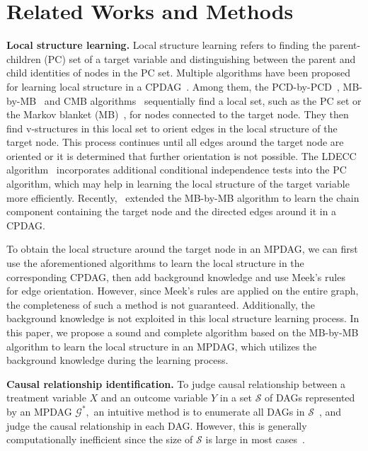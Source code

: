 \documentclass{article}
\begin{document}
\section{Related Works and Methods}
\label{sec:related works}
\textbf{Local structure learning.} Local structure learning refers to finding the parent-children (PC) set of a target variable and distinguishing between the parent and child identities of nodes in the PC set.
Multiple algorithms have been proposed for learning local structure in a CPDAG~\citep{yin2008partial, wang2014discovering, gao2015local, liu2020local, gupta2023local}.
Among them, the PCD-by-PCD~\citep{yin2008partial}, MB-by-MB~\citep{wang2014discovering} and CMB algorithms~\citep{gao2015local} sequentially find a local set, such as the PC set or the Markov blanket (MB)~\citep{tsamardinos2003algorithms, tsamardinos2003time, aliferis2003hiton, pena2007towards}, for nodes connected to the target node. They then find v-structures in this local set to orient edges in the local structure of the target node. This process continues until all edges around the target node are oriented or it is determined that further orientation is not possible. 
The LDECC algorithm~\citep{gupta2023local} incorporates additional conditional independence tests into the PC algorithm, which may help in learning the local structure of the target variable more efficiently.
Recently,~\citet{liu2020local} extended the MB-by-MB algorithm to learn the chain component containing the target node and the directed edges around it in a CPDAG.

To obtain the local structure around the target node in an MPDAG, we can first use the aforementioned algorithms to learn the local structure in the corresponding CPDAG, then add background knowledge and use Meek's rules~\citep{meek1995causal} for edge orientation.
However, since Meek's rules are applied on the entire graph, the completeness of such a method is not guaranteed.
Additionally, the background knowledge is not exploited in this local structure learning process.
In this paper, we propose a sound and complete algorithm based on the MB-by-MB algorithm to learn the local structure in an MPDAG, which utilizes the background knowledge during the learning process.

\textbf{Causal relationship identification.}  To judge causal relationship between a treatment variable $X$ and an outcome variable $Y$ in a set $\mathcal{S}$ of DAGs represented by an MPDAG $\mathcal{G}^*,$ an intuitive method is to enumerate all DAGs in $\mathcal{S}$~\citep{wienobst2023efficient}, and judge the causal relationship in each DAG.
However, this is generally computationally inefficient since the size of $\mathcal{S}$ is large in most cases~\citep{he2015counting, sharma2023counting}.
\end{document}
